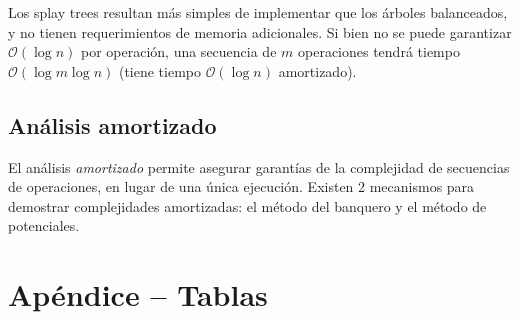 \documentclass{article}
\newcommand{\BigO}[1]{{\mathcal{O}(#1)}}
\begin{document}
Los splay trees resultan más simples de implementar que los árboles balanceados, y no tienen requerimientos de memoria adicionales. Si bien no se puede garantizar $\BigO{\log{n}}$ por operación, una secuencia de $m$ operaciones tendrá tiempo $\BigO{\log{m\log{n}}}$ (tiene tiempo $\BigO{\log{n}}$ amortizado).

\subsection{Análisis amortizado}

El análisis \textit{amortizado} permite asegurar garantías de la complejidad de secuencias de operaciones, en lugar de una única ejecución. Existen 2 mecanismos para demostrar complejidades amortizadas: el método del banquero y el método de potenciales.


\appendix

\section{Apéndice -- Tablas}

\label{table-dict-complexities}
\end{document}
